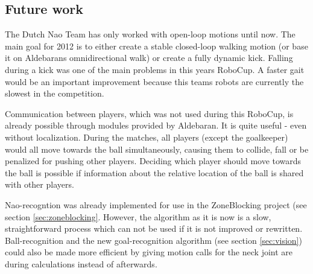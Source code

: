 \documentclass[11pt,a4paper,oneside]{article}
\begin{document}
\subsection{Future work}
The Dutch Nao Team has only worked with open-loop motions until now. The main goal for 2012 is to either create a stable closed-loop walking motion (or base it on Aldebarans omnidirectional walk) or create a fully dynamic kick. Falling during a kick was one of the main problems in this years RoboCup. A faster gait would be an important improvement because this teams robots are currently the slowest in the competition.

Communication between players, which was not used during this RoboCup, is already possible through modules provided by Aldebaran. It is quite useful - even without localization. During the matches, all players (except the goalkeeper) would all move towards the ball simultaneously, causing them to collide, fall or be penalized for pushing other players. Deciding which player should move towards the ball is possible if information about the relative location of the ball is shared with other players.

Nao-recogntion was already implemented for use in the ZoneBlocking project (see section \ref{sec:zoneblocking}. However, the algorithm as it is now is a slow, straightforward process which can not be used if it is not improved or rewritten. Ball-recognition and the new goal-recognition algorithm (see section \ref{sec:vision}) could also be made more efficient by giving motion calls for the neck joint are during calculations instead of afterwards.
\end{document}
